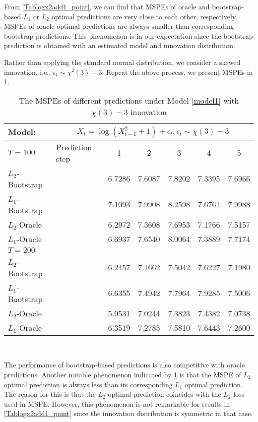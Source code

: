 \documentclass[a4paper]{article}
\begin{document}
From \cref{Tablogx2add1_point}, we can find that MSPEs of oracle and bootstrap-based $L_1$ or $L_2$ optimal predictions are very close to each other, respectively. MSPEs of oracle optimal predictions are always smaller than corresponding bootstrap predictions. This phenomenon is in our expectation since the bootstrap prediction is obtained with an estimated model and innovation distribution. 

Rather than applying the standard normal distribution, we consider a skewed innovation, i.e., $\epsilon_t\sim\chi^2(3)-3$. Repeat the above process, we present MSPEs in \cref{Tablogx2add1_point_chi}.
\begin{table}[htbp]
\centering
  \caption{The MSPEs of different predictions under Model \cref{model1} with $\chi(3)-3$ innovation}
  \vspace{2pt}
  \label{Tablogx2add1_point_chi}
\begin{tabular}{llccccc}
  \toprule 
 Model: & \multicolumn{6}{c}{$X_t = \log(X_{t-1}^2 + 1) + \epsilon_t, \epsilon_t\sim\chi(3)-3 $} \\
 \midrule
    $T = 100$ & Prediction step & 1     & 2     & 3     & 4     & 5 \\[3pt]
    $L_2$-Bootstrap &     & 6.7286 & 7.6087 & 7.8202 & 7.3395 & 7.6966  \\
    $L_1$-Bootstrap &    & 7.1093 & 7.9908 & 8.2598 & 7.6761 & 7.9988\\
    $L_2$-Oracle &  & 6.2972 & 7.3608 & 7.6953 & 7.1766 & 7.5157 \\
    $L_1$-Oracle &   & 6.6937 & 7.6540 & 8.0064 & 7.3889 & 7.7174   \\[3pt]
    $T = 200$ &       &       &       &       &       &  \\[3pt]
    $L_2$-Bootstrap &     & 6.2457 & 7.1662 & 7.5042 & 7.6227 & 7.1980\\
    $L_1$-Bootstrap &    & 6.6355 & 7.4942 & 7.7964 & 7.9285 & 7.5006  \\
    $L_2$-Oracle &  &  5.9531 & 7.0244 & 7.3823 & 7.4382 & 7.0738  \\
    $L_1$-Oracle &   & 6.3519 & 7.2785 & 7.5810 & 7.6443 & 7.2600 \\
       \bottomrule
    \end{tabular}\\
\end{table}
The performance of bootstrap-based predictions is also competitive with oracle predictions. Another notable phenomenon indicated by \cref{Tablogx2add1_point_chi} is that the MSPE of $L_2$ optimal prediction is always less than its corresponding $L_1$ optimal prediction. The reason for this is that the $L_2$ optimal prediction coincides with the $L_2$ loss used in MSPE. However, this phenomenon is not remarkable for results in \cref{Tablogx2add1_point} since the innovation distribution is symmetric in that case.
\end{document}
